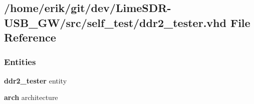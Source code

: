\subsection{/home/erik/git/dev/\+Lime\+S\+D\+R-\/\+U\+S\+B\+\_\+\+G\+W/src/self\+\_\+test/ddr2\+\_\+tester.vhd File Reference}
\label{ddr2__tester_8vhd}
\subsubsection*{Entities}
\begin{DoxyCompactItemize}
\item 
{\bf ddr2\+\_\+tester} entity
\item 
{\bf arch} architecture
\end{DoxyCompactItemize}
